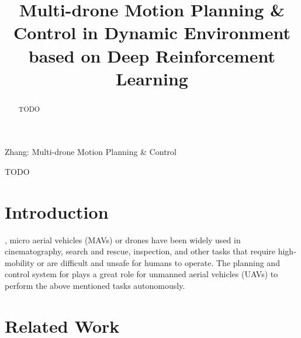 \documentclass[letterpaper,journal,twoside]{IEEEtran}
\begin{document}
\title{Multi-drone Motion Planning \& Control in Dynamic Environment based on Deep Reinforcement Learning}

\author{
}

\maketitle

\begingroup
\renewcommand\thefootnote{\IEEEauthorrefmark{1}}
\endgroup

%
{Zhang: Multi-drone Motion Planning \& Control}



\begin{abstract}
TODO
\end{abstract}

\begin{IEEEkeywords}
  TODO
\end{IEEEkeywords}

\section{Introduction}
, micro aerial vehicles (MAVs) or 
drones have been widely used in cinematography, search and 
rescue, inspection, and other tasks that require 
high-mobility or are difficult and unsafe for humans to 
operate. 
The planning and control system for plays a great role for 
unmanned aerial vehicles (UAVs) to perform the 
above mentioned tasks autonomously.

\section{Related Work}
\end{document}
